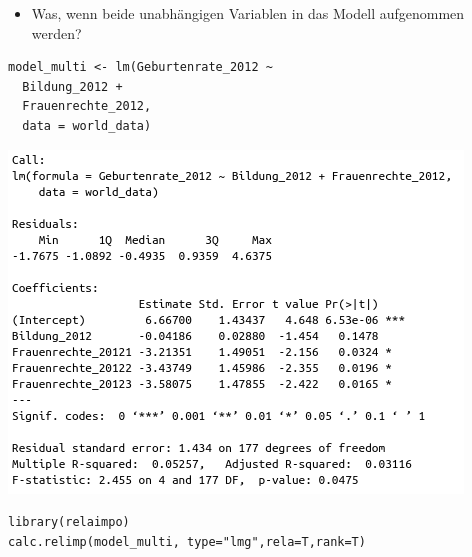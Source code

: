 \documentclass[aspectratio=169, journal, x11names, unknownkeysallowed, hyperref={colorlinks,
linkcolor = SS2,
urlcolor  = F3,
citecolor = F3,
anchorcolor = A4}, 12pt]{beamer}
\begin{document}
  \begin{frame}[t, fragile]
    \begin{minipage}[t]{0.45\textwidth}
        \begin{itemize}
          \item[] Was, wenn beide unabhängigen Variablen in das Modell aufgenommen werden?
        \end{itemize} 
        \begin{lstlisting}
model_multi <- lm(Geburtenrate_2012 ~ 
  Bildung_2012 + 
  Frauenrechte_2012, 
  data = world_data)        
        \end{lstlisting} 
        \centering
        \includegraphics[scale=0.3]{../Plots/sum_multi.png}
      \end{minipage}%
      \begin{minipage}[t]{0.45\textwidth}
        \vspace{-1em}

        \centering
        \begin{lstlisting}
library(relaimpo)
calc.relimp(model_multi, type="lmg",rela=T,rank=T)    
                  \end{lstlisting} 

      \end{minipage}
  \end{frame}
\end{document}
